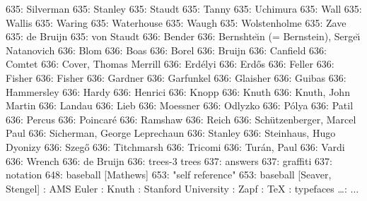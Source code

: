 635: Silverman
635: Stanley
635: Staudt
635: Tanny
635: Uchimura
635: Wall
635: Wallis
635: Waring
635: Waterhouse
635: Waugh
635: Wolstenholme
635: Zave
635: de Bruijn
635: von Staudt
636: Bender
636: Bernshte{\u\i}n (= Bernstein), Serge{\u\i} Natanovich
636: Blom
636: Boas
636: Borel
636: Bruijn
636: Canfield
636: Comtet
636: Cover, Thomas Merrill
636: Erd\'elyi
636: Erd\H os
636: Feller
636: Fisher
636: Fisher
636: Gardner
636: Garfunkel
636: Glaisher
636: Guibas
636: Hammersley
636: Hardy
636: Henrici
636: Knopp
636: Knuth
636: Knuth, John Martin
636: Landau
636: Lieb
636: Moessner
636: Odlyzko
636: P\'olya
636: Patil
636: Percus
636: Poincar\'e
636: Ramshaw
636: Reich
636: Sch\"utzenberger, Marcel Paul
636: Sicherman, George Leprechaun
636: Stanley
636: Steinhaus, Hugo Dyonizy
636: Szeg\H{o}
636: Titchmarsh
636: Tricomi
636: Tur\'an, Paul
636: Vardi
636: Wrench
636: de Bruijn
636: trees-3 trees
637: answers
637: graffiti
637: notation
648: baseball [Mathews]
653: "self reference"
653: baseball [Seaver, Stengel]
\cpage: AMS Euler
\cpage: Knuth
\cpage: Stanford University
\cpage: Zapf
\cpage: \TeX
\cpage: typefaces
\dots: $\ldots\,$
